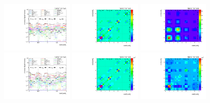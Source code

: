 \begin{figure}[htb]
\begin{center}
 \includegraphics[width=0.32\textwidth]{fig_fullRun2UL/unfolding/combined/deltaSystCombinedlog_rebinnedB_c_rr_mttbar.pdf}
 \includegraphics[width=0.32\textwidth]{fig_fullRun2UL/unfolding/combined/StatCovMatrix_rebinnedB_c_rr_mttbar.pdf}
 \includegraphics[width=0.32\textwidth]{fig_fullRun2UL/unfolding/combined/TotalSystCovMatrix_rebinnedB_c_rr_mttbar.pdf} \\
 \includegraphics[width=0.32\textwidth]{fig_fullRun2UL/unfolding/combined/deltaSystCombinedlogNorm_rebinnedB_c_rr_mttbar.pdf}
 \includegraphics[width=0.32\textwidth]{fig_fullRun2UL/unfolding/combined/StatCovMatrixNorm_rebinnedB_c_rr_mttbar.pdf}
 \includegraphics[width=0.32\textwidth]{fig_fullRun2UL/unfolding/combined/TotalSystCovMatrixNorm_rebinnedB_c_rr_mttbar.pdf} \\

\end{center}
\end{figure}
